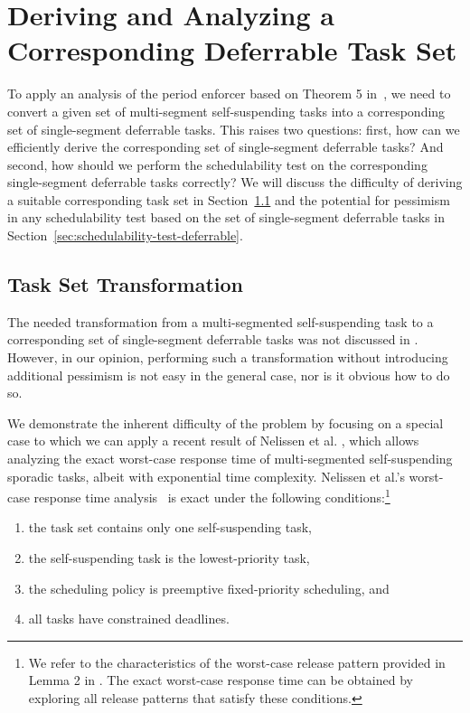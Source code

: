 
\section{Deriving and Analyzing a Corresponding Deferrable Task Set}
\label{sec:convert}

To apply an analysis of the period enforcer based on Theorem 5 in~\cite{Raj:suspension1991}, we need to convert a given set of multi-segment self-suspending tasks into a corresponding set of single-segment deferrable tasks. This raises two questions: first, how can we efficiently derive the corresponding set of single-segment deferrable tasks? And second, how should we perform the schedulability test on the corresponding single-segment deferrable tasks correctly? We will discuss the difficulty of deriving a suitable corresponding task set in Section~\ref{sec:transformation-exponential} and the potential for pessimism in any schedulability test based on the set of single-segment deferrable tasks  in Section~\ref{sec:schedulability-test-deferrable}.

\subsection{Task Set Transformation}
\label{sec:transformation-exponential}

The needed transformation from a multi-segmented self-suspending task to a corresponding set of single-segment deferrable tasks was not discussed in \cite{Raj:suspension1991}. However, in our opinion, performing such a transformation without introducing additional pessimism is not easy in the general case, nor is it obvious how to do so.

We demonstrate the inherent difficulty of the problem by focusing on a special case to which we can apply a recent result of Nelissen et al. \cite{ecrts15nelissen}, which allows analyzing the exact worst-case response time of multi-segmented self-suspending sporadic tasks, albeit with exponential time complexity. 
Nelissen et al.'s worst-case response time analysis~\cite{ecrts15nelissen} is exact under the following conditions:\footnote{We refer to the characteristics of the worst-case release pattern provided in Lemma 2 in \cite{ecrts15nelissen}. The exact worst-case response time can be obtained by exploring all  release patterns that satisfy these conditions.} 
\begin{enumerate}
	\item the task set contains only one self-suspending task, 
	\item the self-suspending task is the lowest-priority task, 
	\item the scheduling policy is preemptive fixed-priority scheduling, and 
	\item all tasks have constrained deadlines.	
\end{enumerate}


